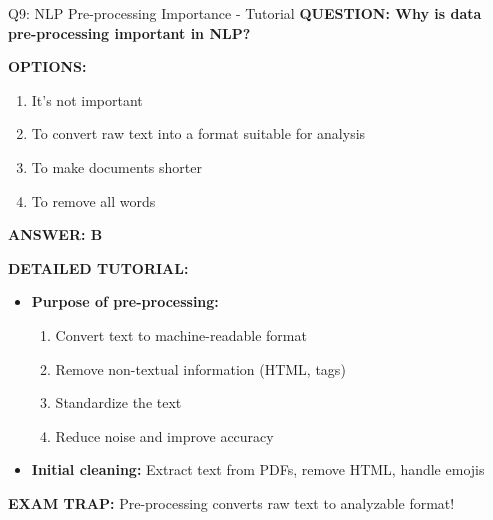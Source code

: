 \documentclass[8pt]{beamer}
\begin{document}
	\begin{frame}{Q9: NLP Pre-processing Importance - Tutorial}
		\fontsize{6.5}{7.5}\selectfont
		\textbf{QUESTION: Why is data pre-processing important in NLP?}
		
		\vspace{0.1cm}
		\textbf{OPTIONS:}
		\begin{enumerate}
			\item It's not important
			\item To convert raw text into a format suitable for analysis
			\item To make documents shorter
			\item To remove all words
		\end{enumerate}
		
		\vspace{0.1cm}
		\textcolor{myblue}{\textbf{ANSWER: B}}
		
		\vspace{0.1cm}
		\textbf{DETAILED TUTORIAL:}
		\begin{itemize}
			\item \textbf{Purpose of pre-processing:}
			\begin{enumerate}
				\item Convert text to machine-readable format
				\item Remove non-textual information (HTML, tags)
				\item Standardize the text
				\item Reduce noise and improve accuracy
			\end{enumerate}
			\item \textbf{Initial cleaning:} Extract text from PDFs, remove HTML, handle emojis
		\end{itemize}
		
		\textcolor{myred}{\textbf{EXAM TRAP:}} Pre-processing converts \textcolor{myblue}{raw text to analyzable format}!
	\end{frame}
	
\end{document}
